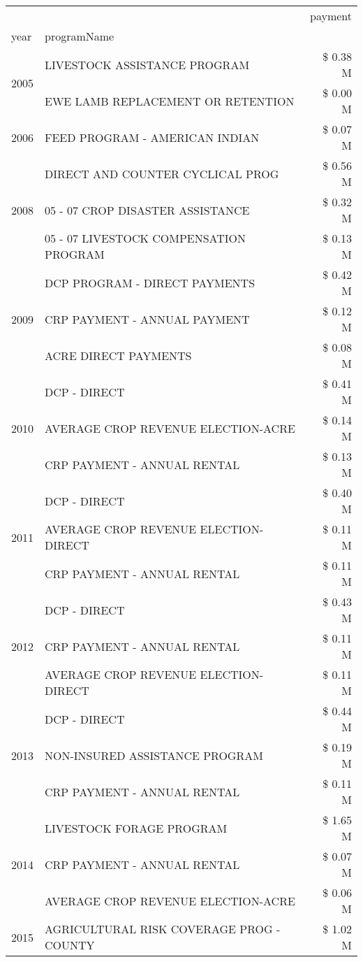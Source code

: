\begin{tabular}{llr}
\toprule
 &  & payment \\
year & programName &  \\
\midrule
\multirow[t]{2}{*}{2005} & LIVESTOCK ASSISTANCE PROGRAM & \$ 0.38 M \\
 & EWE LAMB REPLACEMENT OR RETENTION & \$ 0.00 M \\
\cline{1-3}
2006 & FEED PROGRAM - AMERICAN INDIAN & \$ 0.07 M \\
\cline{1-3}
\multirow[t]{3}{*}{2008} & DIRECT AND COUNTER CYCLICAL PROG & \$ 0.56 M \\
 & 05 - 07 CROP DISASTER ASSISTANCE & \$ 0.32 M \\
 & 05 - 07 LIVESTOCK COMPENSATION PROGRAM & \$ 0.13 M \\
\cline{1-3}
\multirow[t]{3}{*}{2009} & DCP PROGRAM - DIRECT PAYMENTS & \$ 0.42 M \\
 & CRP PAYMENT - ANNUAL PAYMENT & \$ 0.12 M \\
 & ACRE DIRECT PAYMENTS & \$ 0.08 M \\
\cline{1-3}
\multirow[t]{3}{*}{2010} & DCP - DIRECT & \$ 0.41 M \\
 & AVERAGE CROP REVENUE ELECTION-ACRE & \$ 0.14 M \\
 & CRP PAYMENT - ANNUAL RENTAL & \$ 0.13 M \\
\cline{1-3}
\multirow[t]{3}{*}{2011} & DCP - DIRECT & \$ 0.40 M \\
 & AVERAGE CROP REVENUE ELECTION-DIRECT & \$ 0.11 M \\
 & CRP PAYMENT - ANNUAL RENTAL & \$ 0.11 M \\
\cline{1-3}
\multirow[t]{3}{*}{2012} & DCP - DIRECT & \$ 0.43 M \\
 & CRP PAYMENT - ANNUAL RENTAL & \$ 0.11 M \\
 & AVERAGE CROP REVENUE ELECTION-DIRECT & \$ 0.11 M \\
\cline{1-3}
\multirow[t]{3}{*}{2013} & DCP - DIRECT & \$ 0.44 M \\
 & NON-INSURED ASSISTANCE PROGRAM & \$ 0.19 M \\
 & CRP PAYMENT - ANNUAL RENTAL & \$ 0.11 M \\
\cline{1-3}
\multirow[t]{3}{*}{2014} & LIVESTOCK FORAGE PROGRAM & \$ 1.65 M \\
 & CRP PAYMENT - ANNUAL RENTAL & \$ 0.07 M \\
 & AVERAGE CROP REVENUE ELECTION-ACRE & \$ 0.06 M \\
\cline{1-3}
\multirow[t]{3}{*}{2015} & AGRICULTURAL RISK COVERAGE PROG - COUNTY & \$ 1.02 M \\

\end{tabular}
